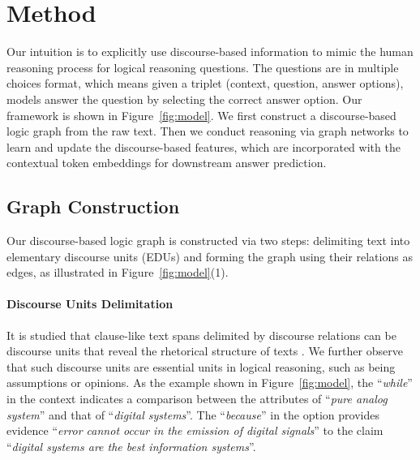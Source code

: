 \documentclass[11pt]{article}
\newcommand{\moe}[1]{{\color{black} #1}}
\begin{document}
    






\section{Method}
\vspace{-1mm}





Our intuition is to explicitly use discourse-based information to mimic the human reasoning process for logical reasoning questions.
The questions are in multiple choices format, which means given a triplet (context, question, answer options), models answer the question by selecting the correct answer option. 
Our framework is shown in Figure~\ref{fig:model}.
We first construct a discourse-based logic graph from the raw text. 
Then we conduct reasoning via graph networks to learn and update the discourse-based features, which are incorporated with the contextual token embeddings for downstream answer prediction.



\subsection{Graph Construction}
\moe{Our} discourse-based logic graph is constructed via two steps: delimiting text into elementary discourse units (EDUs) and forming the graph using their relations as edges, as illustrated in Figure~\ref{fig:model}(1).


\paragraph{Discourse Units Delimitation} 




It is studied that clause-like text spans delimited by discourse relations can be discourse units that reveal the rhetorical structure of texts \cite{mann1988rhetorical,prasad2008penn}.
We further observe that such discourse units are essential units in logical reasoning, such as being assumptions or opinions.
As the example shown in Figure~\ref{fig:model}, the ``\textit{while}'' in the context indicates a comparison between the attributes of ``\textit{pure analog system}'' and that of ``\textit{digital systems}''.
The ``\textit{because}'' in the option provides evidence ``\textit{error cannot occur in the emission of digital signals}'' to the claim ``\textit{digital systems are the best information systems}''.
\end{document}

